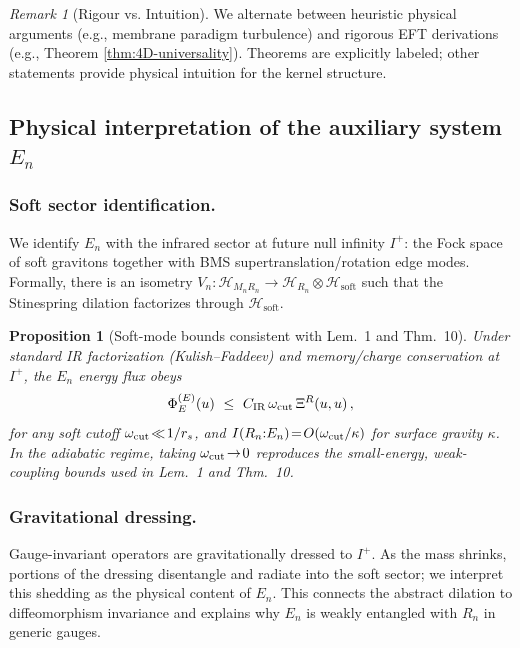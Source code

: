 \documentclass[11pt,a4paper]{article}
\newcommand{\Iplus}{I^{+}}
\theoremstyle{plain}
\newtheorem{proposition}[theorem]{Proposition}
\theoremstyle{definition}
\theoremstyle{remark}
\newtheorem{remark}[theorem]{Remark}
\begin{document}
\begin{remark}[Rigour vs. Intuition]
We alternate between heuristic physical arguments (e.g., membrane paradigm turbulence) and rigorous EFT derivations (e.g., Theorem \ref{thm:4D-universality}). Theorems are explicitly labeled; other statements provide physical intuition for the kernel structure.
\end{remark}

\subsection*{Physical interpretation of the auxiliary system $E_n$}
\label{sec:En-soft}
\subsubsection{Soft sector identification.}
We identify $E_n$ with the infrared sector at future null infinity $\Iplus$: the Fock space of soft gravitons together with BMS supertranslation/rotation edge modes.
Formally, there is an isometry $V_n:\mathcal{H}_{M_nR_n}\!\to\!\mathcal{H}_{R_n}\otimes\mathcal{H}_{\mathrm{soft}}$ such that the Stinespring dilation factorizes through $\mathcal{H}_{\mathrm{soft}}$.
\begin{proposition}[Soft-mode bounds consistent with Lem.~1 and Thm.~10]\label{prop:En-soft}
Under standard IR factorization (Kulish--Faddeev) and memory/charge conservation at $\Iplus$, the $E_n$ energy flux obeys
\begin{equation}
\Phi_E^{(E)}(u)\ \le\ C_{\rm IR}\,\omega_{\rm cut}\,\Xi^R(u,u)\,,
\end{equation}
for any soft cutoff $\omega_{\rm cut}\!\ll\! 1/r_s$, and $I(R_n{:}E_n)\!=\!O(\omega_{\rm cut}/\kappa)$ for surface gravity $\kappa$.
In the adiabatic regime, taking $\omega_{\rm cut}\!\to\!0$ reproduces the small-energy, weak-coupling bounds used in Lem.~1 and Thm.~10.
\end{proposition}
\subsubsection{Gravitational dressing.}
Gauge-invariant operators are gravitationally dressed to $\Iplus$.
As the mass shrinks, portions of the dressing disentangle and radiate into the soft sector; we interpret this shedding as the physical content of $E_n$.
This connects the abstract dilation to diffeomorphism invariance and explains why $E_n$ is weakly entangled with $R_n$ in generic gauges.
\end{document}
